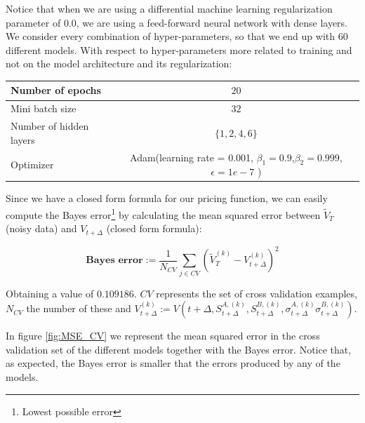 Notice that when we are using a differential machine learning regularization parameter of 0.0, we are using a feed-forward neural network with dense layers. We consider every combination of hyper-parameters, so that we end up with $60$ different models. With respect to hyper-parameters more related to training and not on the model architecture and its regularization:


\begin{center}
\begin{tabular}{||l | c||} 
 \hline
 Number of epochs & $20$ \\
 \hline
 Mini batch size  & $32$  \\
 \hline
 Number of hidden layers  & $\{1 ,2 ,4 ,6\}$  \\
 \hline
 Optimizer &  Adam(learning rate = 0.001, $\beta_1=0.9$,$\beta_2=0.999$,$\epsilon=1e-7$ ) \\
  \hline
 \end{tabular}
\end{center}

Since we have a closed form formula for our pricing function, we can easily compute the Bayes error\footnote{Lowest possible error} by calculating the mean squared error between $\tilde{V}_{T}$ (noisy data) and $V_{t+\Delta}$ (closed form formula):

$$\textbf{Bayes error}:=\frac{1}{N_{CV}}\sum_{j\in CV}\left(\tilde{V}_{T}^{(k)}-V_{t+\Delta}^{(k)}\right)^2$$

Obtaining a value of $0.109186$. $CV$ represents the set of cross validation examples, $N_{CV}$ the number of these and $V_{t+\Delta}^{(k)} := V\left(t+\Delta, S_{t+\Delta}^{A,(k)}
,S_{t+\Delta}^{B,(k)}
,\sigma_{t+\Delta}^{A,(k)}
\sigma_{t+\Delta}^{B,(k)}\right)$.

In figure \ref{fig:MSE_CV} we represent the mean squared error in the cross validation set of the different models together with the Bayes error. Notice that, as expected, the Bayes error is smaller that the errors produced by any of the models.

